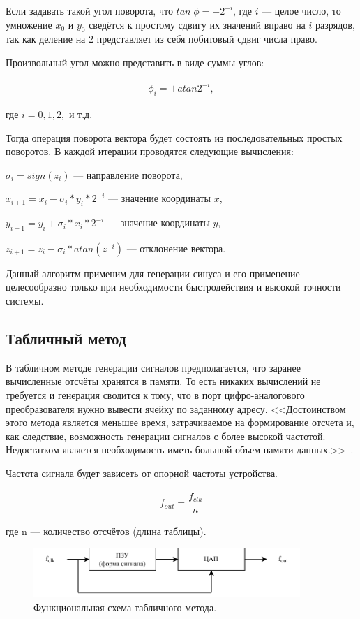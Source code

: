 	Если задавать такой угол поворота, что $tan\;\phi = \pm 2^{-i}$, где $i$ --- целое число, то умножение $x_{0}$ и $y_{0}$ сведётся к простому сдвигу их значений вправо на $i$ разрядов, так как деление на 2 представляет из себя побитовый сдвиг числа право.

	Произвольный угол можно представить в виде суммы углов:

	\begin{gather}
	\phi_{i}=\pm atan2^{-i}, 
	\end{gather}	
	
	где $i = 0, 1, 2,$ и т.д.

	Тогда операция поворота вектора будет состоять из последовательных простых поворотов. В каждой итерации проводятся следующие вычисления:

	$\sigma_{i} 	= sign(z_{i})$ --- направление поворота,

	$x_{i+1} = x_{i} - \sigma_{i}*y_{i}*2^{-i}$ --- значение координаты $x$,

	$y_{i+1} = y_{i} + \sigma_{i}*x_{i}*2^{-i}$ --- значение координаты $y$,

	$z_{i+1} = z_{i} - \sigma_{i}*atan(z^{-i})$ --- отклонение вектора.

	Данный алгоритм применим для генерации синуса и его применение целесообразно только при необходимости быстродействия и высокой точности системы.
	
\subsection{Табличный метод}		
	В табличном методе генерации сигналов предполагается, что заранее вычисленные отсчёты хранятся в памяти. То есть никаких вычислений не требуется и генерация сводится к тому, что в порт цифро-аналогового преобразователя нужно вывести ячейку по заданному адресу. <<Достоинством этого метода является меньшее время, затрачиваемое на формирование отсчета и, как следствие, возможность генерации сигналов с более высокой частотой. Недостатком является необходимость иметь большой объем памяти данных.>>~\cite{leso}. 
	
	Частота сигнала будет зависеть от опорной частоты устройства.
	
	\begin{gather}
	f_{out}=\dfrac{f_{clk}}{n}
	\end{gather}	
	
	где n --- количество отсчётов (длина таблицы).	
	
	\begin{figure}[H]
	\centering
    \includegraphics[width=0.9\textwidth]{../image/table_func.pdf}
    \caption{Функциональная схема табличного метода.}
	\end{figure}
	
